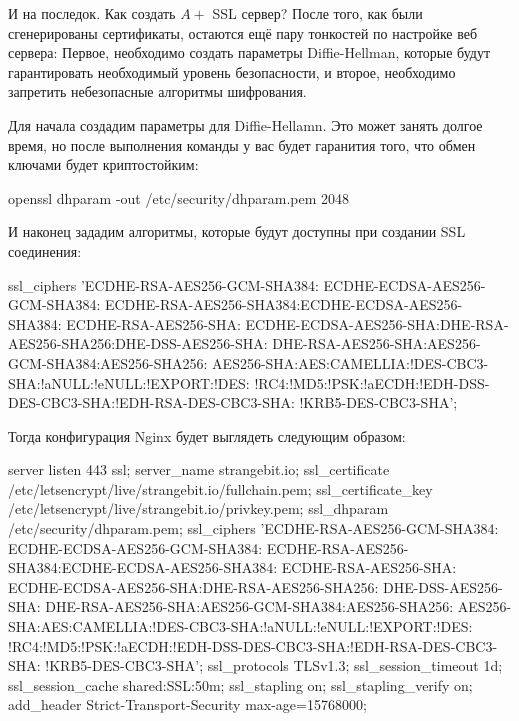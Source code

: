И на последок. Как создать $A+$ SSL сервер? После того, как были сгенерированы
сертификаты, остаются ещё пару тонкостей по настройке веб сервера: Первое, необходимо
создать параметры Diffie-Hellman, которые будут гарантировать необходимый уровень
безопасности, и второе, необходимо запретить небезопасные алгоритмы шифрования.

Для начала создадим параметры для Diffie-Hellamn. Это может занять долгое время, но
после выполнения команды у вас будет гаранития того, что обмен ключами будет 
криптостойким:

\begin{python}
openssl dhparam -out /etc/security/dhparam.pem 2048
\end{python}

И наконец зададим алгоритмы, которые будут доступны при создании SSL соединения:

\begin{python}
    ssl_ciphers 'ECDHE-RSA-AES256-GCM-SHA384:
    ECDHE-ECDSA-AES256-GCM-SHA384:
    ECDHE-RSA-AES256-SHA384:ECDHE-ECDSA-AES256-SHA384:
    ECDHE-RSA-AES256-SHA:
    ECDHE-ECDSA-AES256-SHA:DHE-RSA-AES256-SHA256:DHE-DSS-AES256-SHA:
    DHE-RSA-AES256-SHA:AES256-GCM-SHA384:AES256-SHA256:
    AES256-SHA:AES:CAMELLIA:!DES-CBC3-SHA:!aNULL:!eNULL:!EXPORT:!DES:
    !RC4:!MD5:!PSK:!aECDH:!EDH-DSS-DES-CBC3-SHA:!EDH-RSA-DES-CBC3-SHA:
    !KRB5-DES-CBC3-SHA';
\end{python}

Тогда конфигурация Nginx будет выглядеть следующим образом:

\begin{python}
server {
    listen 443 ssl;
    server_name strangebit.io;
    ssl_certificate /etc/letsencrypt/live/strangebit.io/fullchain.pem;
    ssl_certificate_key /etc/letsencrypt/live/strangebit.io/privkey.pem;
    ssl_dhparam /etc/security/dhparam.pem;
    ssl_ciphers 'ECDHE-RSA-AES256-GCM-SHA384:
    ECDHE-ECDSA-AES256-GCM-SHA384:
    ECDHE-RSA-AES256-SHA384:ECDHE-ECDSA-AES256-SHA384:
    ECDHE-RSA-AES256-SHA:
    ECDHE-ECDSA-AES256-SHA:DHE-RSA-AES256-SHA256:
    DHE-DSS-AES256-SHA:
    DHE-RSA-AES256-SHA:AES256-GCM-SHA384:AES256-SHA256:
    AES256-SHA:AES:CAMELLIA:!DES-CBC3-SHA:!aNULL:!eNULL:!EXPORT:!DES:
    !RC4:!MD5:!PSK:!aECDH:!EDH-DSS-DES-CBC3-SHA:!EDH-RSA-DES-CBC3-SHA:
    !KRB5-DES-CBC3-SHA';
    ssl_protocols TLSv1.3;
    ssl_session_timeout 1d;
    ssl_session_cache shared:SSL:50m;
    ssl_stapling on;
    ssl_stapling_verify on;
    add_header Strict-Transport-Security max-age=15768000;
}
\end{python}

